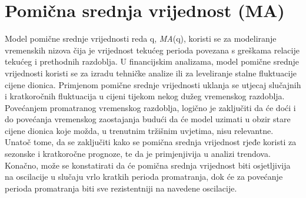 \documentclass[a4paper,12pt,oneside]{memoir}
\begin{document}

                


        \section{Pomična srednja vrijednost (MA)}

            Model pomične srednje vrijednosti reda q, \textit{MA}(q), koristi se za modeliranje vremenskih nizova čija je vrijednost tekućeg perioda povezana s greškama relacije tekućeg i prethodnih razdoblja. U financijskim analizama, model pomične srednje vrijednosti koristi se za izradu tehničke analize ili za leveliranje stalne fluktuacije cijene dionica. Primjenom pomične srednje vrijednosti uklanja se utjecaj slučajnih i kratkoročnih fluktuacija u cijeni tijekom nekog dužeg vremenskog razdoblja. Povećanjem promatranog vremenskog razdoblja, logično je zaključiti da će doći i do povećanja vremenskog zaostajanja budući da će model uzimati u obzir stare cijene dionica koje možda, u trenutnim tržišnim uvjetima, nisu relevantne. Unatoč tome, da se zaključiti kako se pomična srednja vrijednost rjeđe koristi za sezonske i kratkoročne prognoze, te da je primjenjivija u analizi trendova. Konačno, može se konstatirati da će pomična srednja vrijednost biti osjetljivija na oscilacije u slučaju vrlo kratkih perioda promatranja, dok će za povećanje perioda promatranja biti sve rezistentniji na navedene oscilacije.
\end{document}
